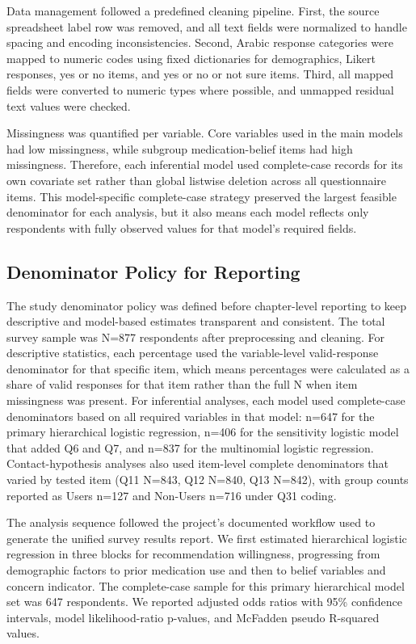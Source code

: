 Data management followed a predefined cleaning pipeline. First, the
source spreadsheet label row was removed, and all text fields were
normalized to handle spacing and encoding inconsistencies. Second,
Arabic response categories were mapped to numeric codes using fixed
dictionaries for demographics, Likert responses, yes or no items, and
yes or no or not sure items. Third, all mapped fields were converted to
numeric types where possible, and unmapped residual text values were
checked.

Missingness was quantified per variable. Core variables used in the main
models had low missingness, while subgroup medication-belief items had
high missingness. Therefore, each inferential model used complete-case
records for its own covariate set rather than global listwise deletion
across all questionnaire items. This model-specific complete-case
strategy preserved the largest feasible denominator for each analysis,
but it also means each model reflects only respondents with fully
observed values for that model's required fields.

\subsection{Denominator Policy for
Reporting}\label{denominator-policy-for-reporting}

The study denominator policy was defined before chapter-level reporting
to keep descriptive and model-based estimates transparent and
consistent. The total survey sample was N=877 respondents after
preprocessing and cleaning. For descriptive statistics, each percentage
used the variable-level valid-response denominator for that specific
item, which means percentages were calculated as a share of valid
responses for that item rather than the full N when item missingness was
present. For inferential analyses, each model used complete-case
denominators based on all required variables in that model: n=647 for
the primary hierarchical logistic regression, n=406 for the sensitivity
logistic model that added Q6 and Q7, and n=837 for the multinomial
logistic regression. Contact-hypothesis analyses also used item-level
complete denominators that varied by tested item (Q11 N=843, Q12 N=840,
Q13 N=842), with group counts reported as Users n=127 and Non-Users
n=716 under Q31 coding.

The analysis sequence followed the project's documented workflow used to
generate the unified survey results report. We first estimated
hierarchical logistic regression in three blocks for recommendation
willingness, progressing from demographic factors to prior medication
use and then to belief variables and concern indicator. The
complete-case sample for this primary hierarchical model set was 647
respondents. We reported adjusted odds ratios with 95\% confidence
intervals, model likelihood-ratio p-values, and McFadden pseudo
R-squared values.

